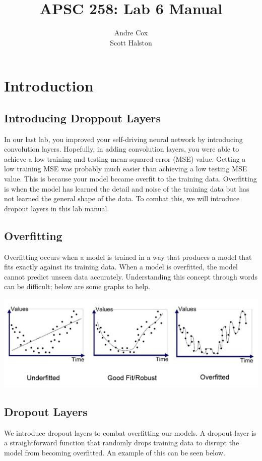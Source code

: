 \documentclass[11pt]{report}
\title{APSC 258: Lab 6 Manual}
\author{Andre Cox  \\ Scott Halston}
\begin{document}
\maketitle
\tableofcontents

\clearpage

\chapter{Introduction}
\section{Introducing Droppout Layers}
In our last lab, you improved your self-driving neural network by introducing convolution layers. Hopefully, in adding convolution layers, you were able to achieve a low training and testing mean squared error (MSE) value. Getting a low training MSE was probably much easier than achieving a low testing MSE value. This is because your model became overfit to the training data. Overfitting is when the model has learned the detail and noise of the training data but has not learned the general shape of the data. To combat this, we will introduce dropout layers in this lab manual.

\section{Overfitting}
Overfitting occurs when a model is trained in a way that produces a model that fits exactly against its training data. When a model is overfitted, the model cannot predict unseen data accurately. Understanding this concept through words can be difficult; below are some graphs to help.

\begin{center}
    \includegraphics[scale=0.325]{./images/overfitexample.png}
\end{center}

\section{Dropout Layers}
We introduce dropout layers to combat overfitting our models. A dropout layer is a straightforward function that randomly drops training data to disrupt the model from becoming overfitted. An example of this can be seen below.
\end{document}
